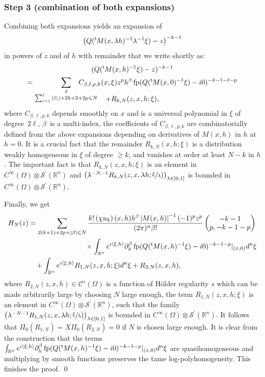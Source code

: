 \documentclass[JEP,XML,SOM,Unicode]{cedram}
\let\pazocal\mathscr
\theoremstyle{definition}
\let\euler X
\DeclareMathOperator*{\pf}{fp}
\newcommand{\module}[1]{\left|#1\right|}
\newcommand{\opencl}[1]{\mathopen{}\mathclose{\left]#1 \right]}}
\newcommand{\step}[1]{\subsubsection*{Step #1}}
\newcommand\fantom{\\ &\phantom{=}\,}
\renewcommand{\t}{{{}^{\mathrm{t}\mkern-2mu}}}
\begin{document}
\step{3 (combination of both expansions)}
Combining both expansions yields an expansion of
\[
\big(Q(\t M(x,\lambda h)^{-1}\lambda^{-1}\xi)-z\big)^{-k-1}
\]
in powers of $z$ and of $h$
with remainder that we write shortly as:
\begin{multline*}
(Q(\t M(x,h)^{-1}\xi)-z)^{-k-1}\\
= \sum_{\substack{\ell\\\sum_{i=1}^\ell\vert \beta_i\vert+2k+2+2p\leqslant N}}\hspace*{-10mm} C_{\beta,\ell,p,k}(x,\xi) z^p h^\beta \pf(Q(\t M(x, 0)^{-1}\xi)-i0)^{-k-1-\ell-p}\\[-15pt]
+R_{k,N}(z,x,h;\xi),
\end{multline*}
where $C_{\beta,\ell,p,k}$ depends smoothly on $x$ and is a universal polynomial in $\xi$ of degree~$2\ell$, $\beta$~is a multi-index, the coefficients
of $C_{\beta,\ell,p,k}$ are combinatorially defined from the above expansions depending on derivatives of $M(x,h)$ in $h$ at $h\!=\!0$.
It is a crucial fact that the remainder $R_{k,N}(x,h;\xi)$ is a distribution weakly homogeneous in $\xi$ of degree $\geqslant\! k$, and
vanishes at order at least $N-k$ in $h$.
The important fact is that
$R_{k,N}(z,x,h;\xi)$ is an element in $C^\infty\left(\Omega\right)\otimes \pazocal{S}^\prime\left(\mathbb{R}^{n}\right)$ and
$\big(\lambda^{-N-1} R_{k,N}(z,x,\lambda h;\sfrac{\xi}{\lambda})\big)_{\lambda\in \opencl{0,1}} $ is
bounded in $C^\infty\left(\Omega\right)\otimes \pazocal{S}^\prime\left(\mathbb{R}^{n}\right)$.

Finally, we get
\[
\begin{aligned}
H_N(z)&=\sum_{2(k+1)+2p+\vert \beta\vert\leqslant N} \frac{k!\left(\chi u_k\right)(x,h)h^\beta\module{M(x,h)}^{-1}{(-1)^p}z^p}{(2\pi)^n\beta !} \begin{pmatrix}
-k-1\\
p,-k-1-p
\end{pmatrix} \fantom\phantom{=========} \times \int_{\mathbb{R}^n}e^{i\left\langle\xi,h\right\rangle}
\partial^\beta_h \pf(Q(\t M(x, h)^{-1}\xi)-i0)^{-k-1-p}|_{(x,0)}d^n\xi
\fantom +\int_{\mathbb{R}^n}e^{i\left\langle\xi,h\right\rangle}R_{1,N}(z,x,h;\xi)d^n\xi +R_{2,N}(z,x,h),
\end{aligned}
\]
where $R_{2,N}(z,x,h)\in \pazocal{C}^{s}\left(\Omega\right)$ is a function of
Hölder regularity $s$ which can be made arbitrarily large by choosing $N$ large enough, the term
$R_{1,N}(z,x,h;\xi)$ is an element in $C^\infty\left(\Omega\right)\otimes \pazocal{S}^\prime\left(\mathbb{R}^{n}\right)$,
such that the family
$\big(\lambda^{-N-1} R_{1,N}(z,x,\lambda h;\sfrac{\xi}{\lambda})\big)_{\lambda\in \opencl{0,1}} $ is
bounded in $C^\infty\left(\Omega\right)\otimes \pazocal{S}^\prime\left(\mathbb{R}^{n}\right)$.
It follows that $\Pi_0\left(R_{1,N} \right)=\euler\Pi_0\left(R_{2,N} \right)=0$ if $N$ is chosen large enough.
It is clear from the construction that the terms
$\int_{\mathbb{R}^n}e^{i\left\langle\xi,h\right\rangle}
\partial^\beta_h \pf(Q(\t M(x, h)^{-1}\xi)-i0)^{-k-1-p}|_{(x,0)}d^n\xi$ are quasihomogeneous
and multiplying by smooth functions preserves the tame log-polyhomogeneity. This finishes the proof.
\qed
\end{document}
